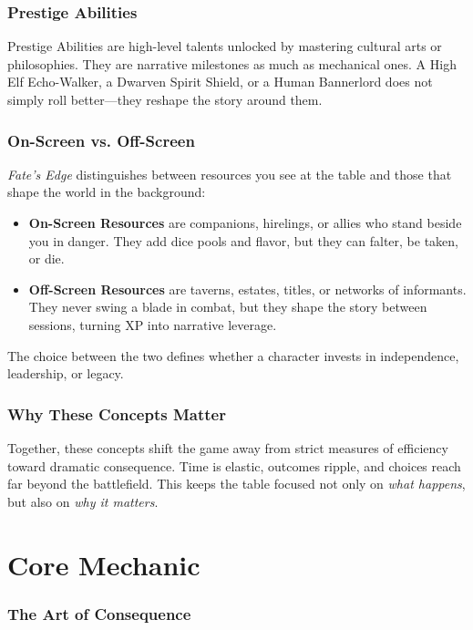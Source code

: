 \documentclass[12pt]{book}
\begin{document}
\section{Prestige Abilities}
Prestige Abilities are high-level talents unlocked by mastering cultural arts or philosophies. They are narrative milestones as much as mechanical ones. A High Elf Echo-Walker, a Dwarven Spirit Shield, or a Human Bannerlord does not simply roll better—they reshape the story around them.  

\section{On-Screen vs. Off-Screen}
\textit{Fate’s Edge} distinguishes between resources you see at the table and those that shape the world in the background:
\begin{itemize}
  \item \textbf{On-Screen Resources} are companions, hirelings, or allies who stand beside you in danger. They add dice pools and flavor, but they can falter, be taken, or die.  
  \item \textbf{Off-Screen Resources} are taverns, estates, titles, or networks of informants. They never swing a blade in combat, but they shape the story between sessions, turning XP into narrative leverage.  
\end{itemize}
The choice between the two defines whether a character invests in independence, leadership, or legacy.  

\section{Why These Concepts Matter}
Together, these concepts shift the game away from strict measures of efficiency toward dramatic consequence. Time is elastic, outcomes ripple, and choices reach far beyond the battlefield. This keeps the table focused not only on \emph{what happens}, but also on \emph{why it matters}.

\part{Core Mechanic}
\section{The Art of Consequence}
\end{document}
